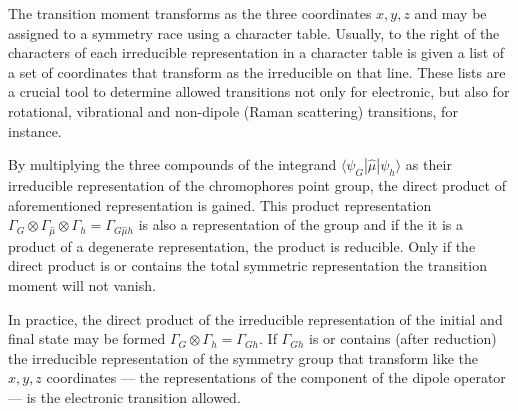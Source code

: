 			The transition moment transforms as the three coordinates $x,y,z$ and may be assigned to a symmetry race using a character table. Usually, to the right of the characters of each irreducible representation in a character table is given a list of a set of coordinates that transform as the irreducible on that line. These lists are a crucial tool to determine allowed transitions not only for electronic, but also for rotational, vibrational and non-dipole (Raman scattering) transitions, for instance.

			By multiplying the three compounds of the integrand $\langle\psi_G|\hat{\mu}|\psi_h\rangle$ as their irreducible representation of the chromophores point group, the direct product of aforementioned representation is gained. This product representation $\Gamma_G\otimes\Gamma_{\hat{\mu}}\otimes\Gamma_h=\Gamma_{G\hat{\mu}h}$ is also a representation of the group and if the it is a product of a degenerate representation, the product is reducible. Only if the direct product is or contains the total symmetric representation the transition moment will not vanish.

			In practice, the direct product of the irreducible representation of the initial and final state may be formed $\Gamma_G\otimes\Gamma_h=\Gamma_{Gh}$. If $\Gamma_{Gh}$ is or contains (after reduction) the irreducible representation of the symmetry group that transform like the $x,y,z$ coordinates --- the representations of the component of the dipole operator --- is the electronic transition allowed.


